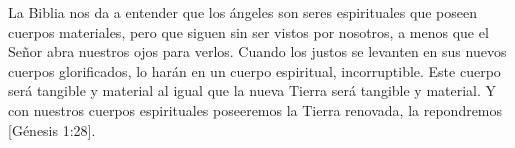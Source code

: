 La Biblia nos da a entender que los ángeles son seres espirituales que poseen cuerpos materiales, pero que siguen sin ser vistos por nosotros, a menos que el Señor abra nuestros ojos para verlos. Cuando los justos se levanten en sus nuevos cuerpos glorificados, lo harán en un cuerpo espiritual, incorruptible. Este cuerpo será tangible y material al igual que la nueva Tierra será tangible y material. Y con nuestros cuerpos espirituales poseeremos la Tierra renovada, la repondremos [Génesis 1:28].







